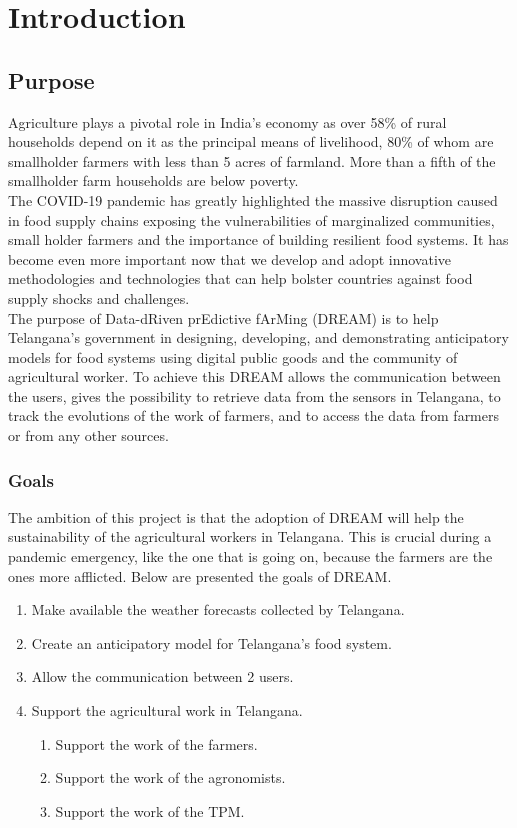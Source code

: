 \section{Introduction}
\subsection{Purpose}
Agriculture plays a pivotal role in India’s economy as over 58\% of rural households depend on it as the principal means of livelihood, 80\% of whom are smallholder farmers with less than 5 acres of farmland. More than a fifth of the smallholder farm households are below poverty. \\
The COVID-19 pandemic has greatly highlighted the massive disruption caused in food supply chains exposing the vulnerabilities of marginalized communities, small holder farmers and the importance of building resilient food systems. It has become even more important now that we develop and adopt innovative methodologies and technologies that can help bolster countries against food supply shocks and challenges.\\
The purpose of Data-dRiven prEdictive fArMing (DREAM) is to help Telangana’s government in designing, developing, and demonstrating anticipatory models for food systems using digital public goods and the community of agricultural worker.
To achieve this DREAM allows the communication between the users, gives the possibility to retrieve data from the sensors in Telangana, to track the evolutions of the work of farmers, and to access the data from farmers or from any other sources.

\subsubsection{Goals}
The ambition of this project is that the adoption of DREAM will help the sustainability of the agricultural workers in Telangana. This is crucial during a pandemic emergency, like the one that is going on, because the farmers are the ones more afflicted. Below are presented the goals of DREAM. 
\begin{enumerate}[label=\textbf{G.\arabic*}]
	\item Make available the weather forecasts collected by Telangana.

	\item Create an anticipatory model for Telangana’s food system.

    \item Allow the communication between 2 users.

	\item Support the agricultural work in Telangana.
	\begin{enumerate}[label=\textbf{G.4.\arabic*}]
	    \item Support the work of the farmers.
	    \item Support the work of the agronomists.
	    \item Support the work of the TPM.
	\end{enumerate}

\end{enumerate}

